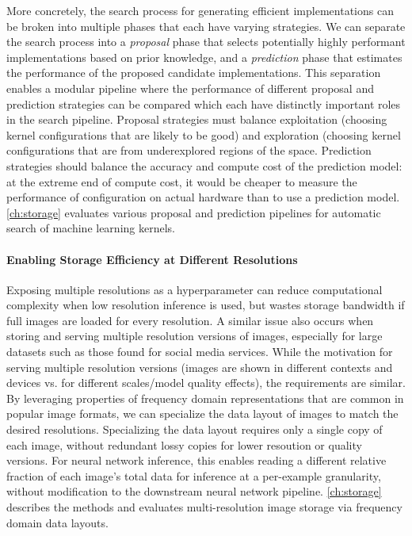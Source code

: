 More concretely, the search process for generating efficient implementations can be broken into multiple phases that each have varying strategies.
We can separate the search process into a \emph{proposal} phase that selects potentially highly performant implementations based on prior knowledge, and a \emph{prediction} phase that estimates the performance of the proposed candidate implementations.
This separation enables a modular pipeline where the performance of different proposal and prediction strategies can be compared which each have distinctly important roles in the search pipeline.
Proposal strategies must balance exploitation (choosing kernel configurations that are likely to be good) and exploration (choosing kernel configurations that are from underexplored regions of the space.
Prediction strategies should balance the accuracy and compute cost of the prediction model: at the extreme end of compute cost, it would be cheaper to measure the performance of configuration on actual hardware than to use a prediction model.
\autoref{ch:storage} evaluates various proposal and prediction pipelines for automatic search of machine learning kernels.


\paragraph{Enabling Storage Efficiency at Different Resolutions}
Exposing multiple resolutions as a hyperparameter can reduce computational complexity when low resolution inference is used, but wastes storage bandwidth if full images are loaded for every resolution.
A similar issue also occurs when storing and serving multiple resolution versions of images, especially for large datasets such as those found for social media services.
While the motivation for serving multiple resolution versions (images are shown in different contexts and devices vs. for different scales/model quality effects), the requirements are similar.
By leveraging properties of frequency domain representations that are common in popular image formats, we can specialize the data layout of images to match the desired resolutions.
Specializing the data layout requires only a single copy of each image, without redundant lossy copies for lower resoution or quality versions.
For neural network inference, this enables reading a different relative fraction of each image's total data for inference at a per-example granularity, without modification to the downstream neural network pipeline.
\autoref{ch:storage} describes the methods and evaluates multi-resolution image storage via frequency domain data layouts.


